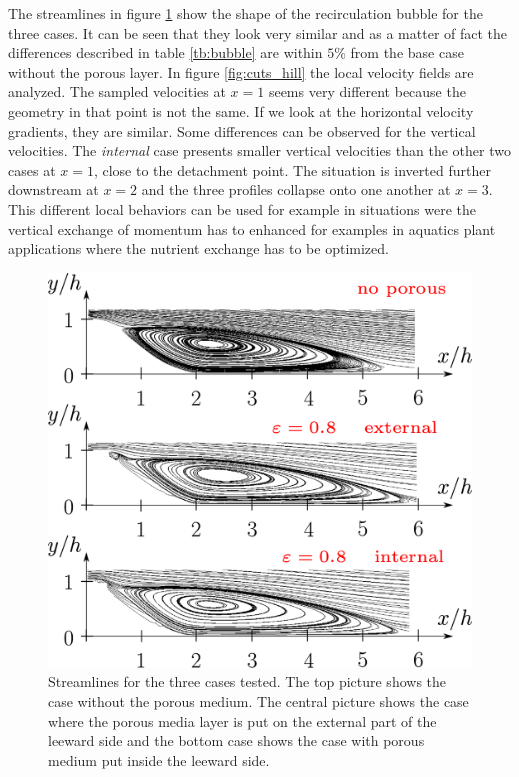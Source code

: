 The streamlines in figure \ref{fig:streamlines} show the shape of the recirculation bubble for the three cases. It can be seen that they look very similar and as a matter of fact the differences described in table \ref{tb:bubble} are within $5\%$ from the base case without the porous layer.
In figure \ref{fig:cuts_hill} the local velocity fields are analyzed. The sampled velocities at $x=1$ seems very different because the geometry in that point is not the same. If we look at the horizontal velocity gradients, they are similar. Some differences can be observed for the vertical velocities. The \textit{internal} case presents smaller vertical velocities than the other two cases at $x=1$, close to the detachment point. The situation is inverted further downstream at $x=2$ and the three profiles collapse onto one another at $x=3$. This different local behaviors can be used for example in situations were the vertical exchange of momentum has to enhanced for examples in aquatics plant applications where the nutrient exchange has to be optimized.

\begin{figure}[H]
	\centering
	\includegraphics[width=1\linewidth]{chapter_5/figure/streamlines}
	\caption{Streamlines for the three cases tested. The top picture shows the case without the porous medium. The central picture shows the case where the porous media layer is put on the external part of the leeward side and the bottom case shows the case with porous medium put inside the leeward side.}
	\label{fig:streamlines}
\end{figure}


